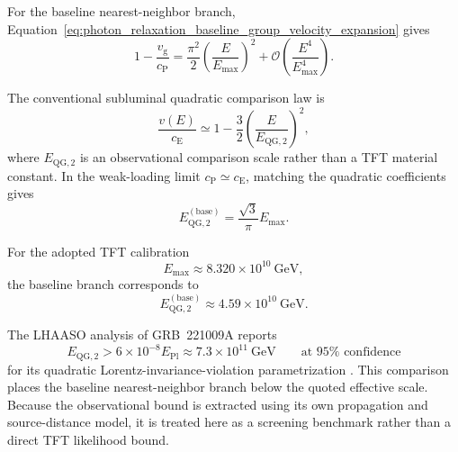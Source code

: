 For the baseline nearest-neighbor branch,
Equation~\eqref{eq:photon_relaxation_baseline_group_velocity_expansion} gives
\begin{equation}
    1
    -
    \frac{
        v_{\mathrm g}
    }{
        c_{\mathrm P}
    }
    =
    \frac{
        \pi^2
    }{
        2
    }
    \left(
        \frac{
            E
        }{
            E_{\mathrm{max}}
        }
    \right)^2
    +
    \mathcal{O}
    \left(
        \frac{
            E^4
        }{
            E_{\mathrm{max}}^4
        }
    \right).
    \label{eq:photon_relaxation_baseline_energy_delay}
\end{equation}

The conventional subluminal quadratic comparison law is
\begin{equation}
    \frac{
        v(E)
    }{
        c_{\mathrm E}
    }
    \simeq
    1
    -
    \frac{3}{2}
    \left(
        \frac{
            E
        }{
            E_{\mathrm{QG},2}
        }
    \right)^2,
    \label{eq:photon_relaxation_standard_quadratic_parameterization}
\end{equation}
where \(E_{\mathrm{QG},2}\) is an observational comparison scale rather than a
TFT material constant. In the weak-loading limit
\(c_{\mathrm P}\simeq c_{\mathrm E}\), matching the quadratic coefficients
gives
\begin{equation}
    E_{\mathrm{QG},2}^{(\mathrm{base})}
    =
    \frac{
        \sqrt{3}
    }{
        \pi
    }
    E_{\mathrm{max}}.
    \label{eq:photon_relaxation_baseline_effective_scale}
\end{equation}

For the adopted TFT calibration
\begin{equation}
    E_{\mathrm{max}}
    \approx
    8.320
    \times
    10^{10}
    \ \mathrm{GeV},
    \label{eq:photon_relaxation_maximum_energy_numerical}
\end{equation}
the baseline branch corresponds to
\begin{equation}
    E_{\mathrm{QG},2}^{(\mathrm{base})}
    \approx
    4.59
    \times
    10^{10}
    \ \mathrm{GeV}.
    \label{eq:photon_relaxation_baseline_effective_scale_numerical}
\end{equation}

The LHAASO analysis of GRB~221009A reports
\begin{equation}
    E_{\mathrm{QG},2}
    >
    6
    \times
    10^{-8}
    E_{\mathrm{Pl}}
    \approx
    7.3
    \times
    10^{11}
    \ \mathrm{GeV}
    \qquad
    \text{at \(95\%\) confidence}
    \label{eq:photon_relaxation_lhaaso_quadratic_bound}
\end{equation}
for its quadratic Lorentz-invariance-violation parametrization
\cite{LHAASO2024LIV}. This comparison places the baseline nearest-neighbor
branch below the quoted effective scale. Because the observational bound is
extracted using its own propagation and source-distance model, it is treated
here as a screening benchmark rather than a direct TFT likelihood bound.

